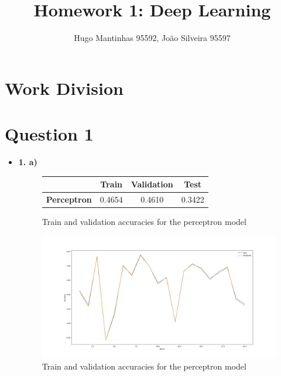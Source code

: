 \documentclass[12pt]{article}
\begin{document}
\title{Homework 1: Deep Learning}
\author{Hugo Mantinhas 95592, João Silveira 95597}

\maketitle

\section*{Work Division}

\section*{Question 1}
\begin{itemize}
    \item \textbf{1. a)}
    \begin{figure}[H]
        \centering
        \begin{tabular}{|c|c|c|c|}
            \toprule
            & \textbf{Train} & \textbf{Validation} & \textbf{Test} \\
            \midrule
            \textbf{Perceptron} & 0.4654 & 0.4610 & 0.3422 \\
            \bottomrule
        \end{tabular}
        \label{tab:1a}
        \caption{Train and validation accuracies for the perceptron model}
    \end{figure}
    \begin{figure}[H]
        \centering
        \includegraphics[width=\linewidth]{../outputs/hw1-q1-1a.png}
        \caption{Train and validation accuracies for the perceptron model}
        \label{fig:1a}
    \end{figure}


\end{itemize}
\end{document}
